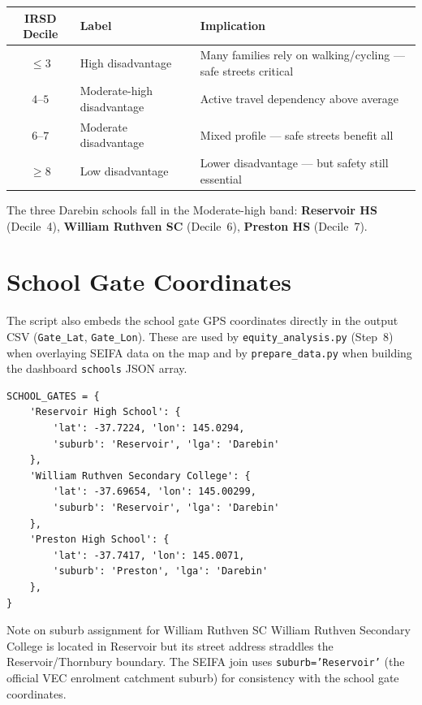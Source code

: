 \documentclass[11pt,a4paper,openany]{book}
\begin{document}
\begin{center}
\begin{tabular}{cll}
\toprule
IRSD Decile & Label & Implication \\
\midrule
$\le 3$ & High disadvantage & Many families rely on walking/cycling --- safe streets critical \\
$4$--$5$ & Moderate-high disadvantage & Active travel dependency above average \\
$6$--$7$ & Moderate disadvantage & Mixed profile --- safe streets benefit all \\
$\ge 8$ & Low disadvantage & Lower disadvantage --- but safety still essential \\
\bottomrule
\end{tabular}
\end{center}

The three Darebin schools fall in the Moderate-high band:
\textbf{Reservoir HS} (Decile~4), \textbf{William Ruthven SC} (Decile~6),
\textbf{Preston HS} (Decile~7).

\section{School Gate Coordinates}

The script also embeds the school gate GPS coordinates directly in the output CSV
(\texttt{Gate\_Lat}, \texttt{Gate\_Lon}).  These are used by \texttt{equity\_analysis.py}
(Step~8) when overlaying SEIFA data on the map and by \texttt{prepare\_data.py} when
building the dashboard \texttt{schools} JSON array.

\begin{lstlisting}[style=python, caption={School gate definitions in seifa\_analysis.py.}]
SCHOOL_GATES = {
    'Reservoir High School': {
        'lat': -37.7224, 'lon': 145.0294,
        'suburb': 'Reservoir', 'lga': 'Darebin'
    },
    'William Ruthven Secondary College': {
        'lat': -37.69654, 'lon': 145.00299,
        'suburb': 'Reservoir', 'lga': 'Darebin'
    },
    'Preston High School': {
        'lat': -37.7417, 'lon': 145.0071,
        'suburb': 'Preston', 'lga': 'Darebin'
    },
}
\end{lstlisting}

\begin{warnbox}{Note on suburb assignment for William Ruthven SC}
William Ruthven Secondary College is located in Reservoir but its street address straddles
the Reservoir/Thornbury boundary.  The SEIFA join uses \texttt{suburb='Reservoir'} (the
official VEC enrolment catchment suburb) for consistency with the school gate coordinates.
\end{warnbox}
\end{document}
